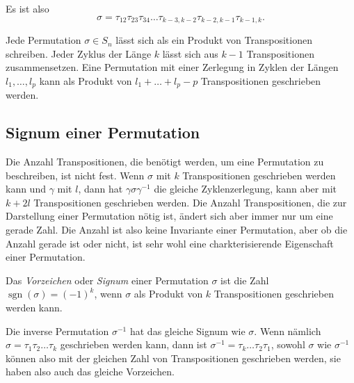 \begin{center}
\end{center}
Es ist also
\[
\sigma 
=
\tau_{12} \tau_{23} \tau_{34} \dots \tau_{k-3,k-2} \tau_{k-2,k-1} \tau_{k-1,k}.
\]
\begin{satz}
Jede Permutation $\sigma\in S_n$ lässt sich als ein Produkt von 
Transpositionen schreiben.
Jeder Zyklus der Länge $k$ lässt sich aus $k-1$ Transpositionen
zusammensetzen.
Eine Permutation mit einer Zerlegung in Zyklen der Längen $l_1,\dots,l_p$
kann als Produkt von $l_1+\dots+l_p-p$ Transpositionen geschrieben werden.
\end{satz}

\subsection{Signum einer Permutation}
Die Anzahl Transpositionen, die benötigt werden, um eine Permutation
zu beschreiben, ist nicht fest. 
Wenn $\sigma$ mit $k$ Transpositionen geschrieben werden kann und
$\gamma$ mit $l$, dann hat $\gamma\sigma\gamma^{-1}$ die gleiche
Zyklenzerlegung, kann aber mit $k+2l$ Transpositionen geschrieben
werden.
Die Anzahl Transpositionen, die zur Darstellung einer Permutation
nötig ist, ändert sich aber immer nur um eine gerade Zahl.
Die Anzahl ist also keine Invariante einer Permutation, aber ob
die Anzahl gerade ist oder nicht, ist sehr wohl eine charkterisierende
Eigenschaft einer Permutation.

\begin{definition}
Das {\em Vorzeichen} oder {\em Signum} einer Permutation $\sigma$ ist
die Zahl $\operatorname{sgn}(\sigma)=(-1)^k$, wenn $\sigma$ als Produkt
von $k$ Transpositionen geschrieben werden kann.
\end{definition}

Die inverse Permutation $\sigma^{-1}$ hat das gleiche Signum wie $\sigma$.
Wenn nämlich $\sigma= \tau_1\tau_2\dots\tau_k$ geschrieben werden kann,
dann ist $\sigma^{-1}=\tau_k\dots\tau_2\tau_1$, sowohl $\sigma$ wie
$\sigma^{-1}$ können also mit der gleichen Zahl von Transpositionen
geschrieben werden, sie haben also auch das gleiche Vorzeichen.

